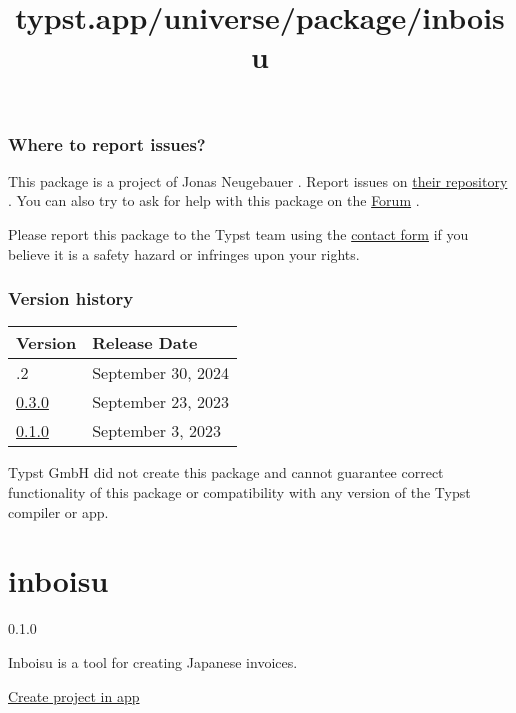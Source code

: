 \subsubsection{Where to report issues?}\label{where-to-report-issues}

This package is a project of Jonas Neugebauer . Report issues on
\href{https://github.com/jneug/typst-finite}{their repository} . You can
also try to ask for help with this package on the
\href{https://forum.typst.app}{Forum} .

Please report this package to the Typst team using the
\href{https://typst.app/contact}{contact form} if you believe it is a
safety hazard or infringes upon your rights.

\label{versions}
\subsubsection{Version history}\label{version-history}

\begin{longtable}[]{@{}ll@{}}
\toprule\noalign{}
Version & Release Date \\
\midrule\noalign{}
\endhead
\bottomrule\noalign{}
\endlastfoot
0.3.2 & September 30, 2024 \\
\href{https://typst.app/universe/package/finite/0.3.0/}{0.3.0} &
September 23, 2023 \\
\href{https://typst.app/universe/package/finite/0.1.0/}{0.1.0} &
September 3, 2023 \\
\end{longtable}

Typst GmbH did not create this package and cannot guarantee correct
functionality of this package or compatibility with any version of the
Typst compiler or app.


\title{typst.app/universe/package/inboisu}

\label{banner}
\label{template-thumbnail}

\section{inboisu}\label{inboisu}

{ 0.1.0 }

Inboisu is a tool for creating Japanese invoices.

\href{/app?template=inboisu&version=0.1.0}{Create project in app}

